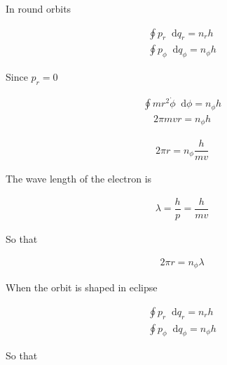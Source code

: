 \documentclass{article}
\newcommand*{\md}{\mathop{}\!\mathrm{d}}
\begin{document}
In round orbits

\begin{equation*}
  \begin{aligned}
    \oint p_r \md q_r = n_r h \\
    \oint p_\phi \md q_\phi = n_\phi h
  \end{aligned}
\end{equation*}

Since $p_r = 0$

\begin{equation*}
  \begin{aligned}
    \oint m r^2 \dot{\phi} \md \phi = n_\phi h
  \end{aligned}
\end{equation*}
\begin{equation*}
  \begin{aligned}
    2 \pi m v r = n_{\phi} h
  \end{aligned}
\end{equation*}

\begin{equation*}
  \begin{aligned}
    2 \pi r = n_{\phi} \dfrac{h}{m v} 
  \end{aligned}
\end{equation*}

The wave length of the electron is

\begin{equation*}
  \begin{aligned}
    \lambda = \dfrac{h}{p} = \dfrac{h}{m v}  
  \end{aligned}
\end{equation*}

So that

\begin{equation*}
  \begin{aligned}
    2 \pi r = n_{\phi} \lambda
  \end{aligned}
\end{equation*}

When the orbit is shaped in eclipse

\begin{equation*}
  \begin{aligned}
    \oint p_r \md q_r = n_r h \\
    \oint p_\phi \md q_\phi = n_\phi h
  \end{aligned}
\end{equation*}

So that
\end{document}
